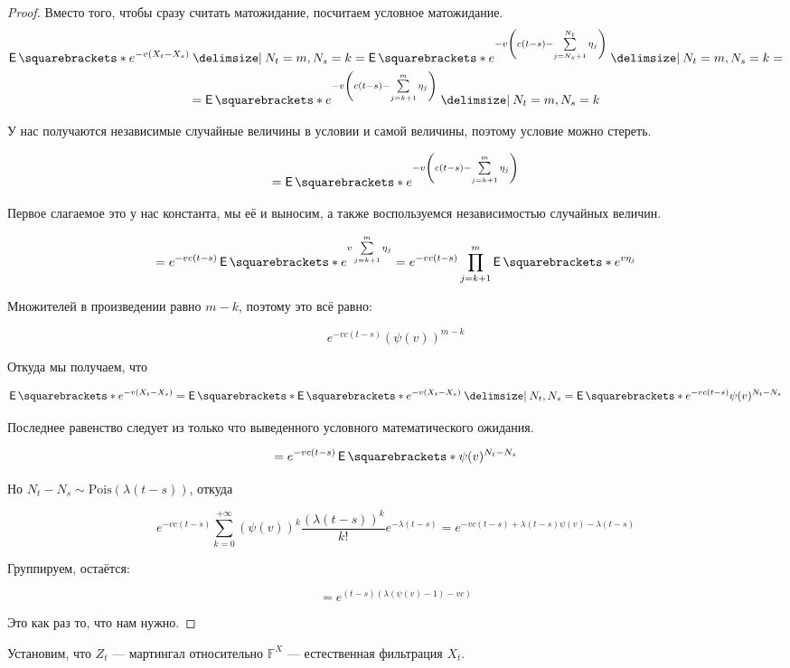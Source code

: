\begin{proof}
  Вместо того, чтобы сразу считать матожидание, посчитаем условное матожидание.
  \begin{multline}
    \E{e^{-v(X_t - X_s)} \given N_t = m, N_s = k} = 
    \E{e^{-v\left(c(t - s) - \sum\limits_{j = N_s + 1}^{N_t} \eta_j\right)} \given
    N_t = m, N_s = k} =\\= \E{e^{-v\left(c(t - s) - \sum\limits_{j = k + 1}^{m} 
    \eta_j\right)} \given N_t = m, N_s = k}
  \end{multline}

  У нас получаются независимые случайные величины в условии и самой величины,
  поэтому условие можно стереть.

  \[
    = \E{e^{-v\left(c(t - s) - \sum\limits_{j = k + 1}^{m} 
    \eta_j\right)}}
  \]

  Первое слагаемое это у нас константа, мы её и выносим, а также воспользуемся независимостью
  случайных величин.

  \[
    = e^{-vc(t - s)}\E{e^{v\sum\limits_{j = k + 1}^{m} 
    \eta_j}} = e^{-vc(t - s)} \prod_{j = k + 1}^m \E{e^{v\eta_j}}
  \]

  Множителей в произведении равно $m - k$, поэтому это всё равно:

  \[
    e^{-vc(t - s)} (\psi(v))^{m - k}
  \]

  Откуда мы получаем, что

  \[
    \E{e^{-v(X_t - X_s)}} = \E{\E{e^{-v(X_t - X_s)} \given N_t, N_s}} =
    \E{e^{-vc(t - s)} \psi(v)^{N_t - N_s}}
  \]

  Последнее равенство следует из только что выведенного условного математического
  ожидания.

  \[
    = e^{-vc(t - s)}\E{\psi(v)^{N_t - N_s}}
  \]

  Но $N_t - N_s \sim \mathrm{Pois}(\lambda(t - s))$, откуда

  \[
    e^{-vc(t - s)} \sum\limits_{k = 0}^{+\infty} (\psi(v))^k \frac{(\lambda(t - 
    s))^k}{k!}  e^{-\lambda(t - s)} = e^{-vc(t- s) + \lambda(t - s)\psi(v) -
     \lambda(t - s)}
  \]

  Группируем, остаётся:

  \[
    = e^{(t - s)(\lambda(\psi(v) - 1) - vc)}
  \]

  Это как раз то, что нам нужно.
\end{proof}

Установим, что $Z_t$ --- мартингал относительно $\mathbb{F}^X$ --- естественная
фильтрация $X_t$.

